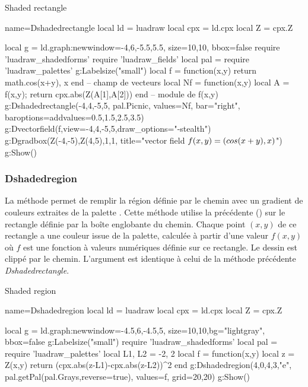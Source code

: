 \begin{demo}{Shaded rectangle}
\begin{luadraw}{name=Dshadedrectangle}
local ld = luadraw
local cpx = ld.cpx
local Z = cpx.Z

local g = ld.graph:new{window={-4,6,-5.5,5.5}, size={10,10}, bbox=false}
require 'luadraw_shadedforms'
require 'luadraw_fields'
local pal = require 'luadraw_palettes'
g:Labelsize("small")
local f = function(x,y) return {math.cos(x+y), x} end -- champ de vecteurs
local Nf = function(x,y) local A = f(x,y); return cpx.abs(Z(A[1],A[2])) end -- module de f(x,y)
g:Dshadedrectangle(-4,4,-5,5, pal.Picnic, {values=Nf, bar="right", baroptions={addvalues={0.5,1.5,2.5,3.5}}})
g:Dvectorfield(f,{view={-4,4,-5,5},draw_options="-stealth"})
g:Dgradbox({Z(-4,-5),Z(4,5),1,1}, {title="vector field $f(x,y)=(\\cos(x+y),x)$"})
g:Show()
\end{luadraw}
\end{demo}

\subsubsection{Dshadedregion}

La méthode  permet de remplir la région définie par le chemin  avec un gradient de couleurs extraites de la palette . Cette méthode utilise la précédente () sur le rectangle définie par la boîte englobante du chemin. Chaque point $(x,y)$ de ce rectangle a une couleur issue de la palette, calculée à partir d'une valeur $f(x,y)$ où $f$ est une fonction à valeurs numériques définie sur ce rectangle. Le dessin est clippé par le chemin. L'argument  est identique à celui de la méthode précédente \emph{Dshadedrectangle}.

\begin{demo}{Shaded region}
\begin{luadraw}{name=Dshadedregion}
local ld = luadraw
local cpx = ld.cpx
local Z = cpx.Z

local g = ld.graph:new{window={-4.5,6,-4.5,5}, size={10,10},bg="lightgray", bbox=false}
g:Labelsize("small")
require 'luadraw_shadedforms'
local pal = require 'luadraw_palettes'
local L1, L2 = -2, 2
local f = function(x,y) 
    local z = Z(x,y)
    return (cpx.abs(z-L1)-cpx.abs(z-L2))^2
end
g:Dshadedregion({4,0,4,3,"e"}, pal.getPal(pal.Grays,{reverse=true}), {values=f, grid={20,20}})
g:Show()
\end{luadraw}
\end{demo}
